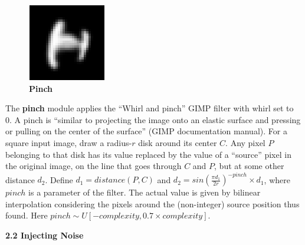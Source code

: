 \documentclass{article} %
\begin{document}
\begin{figure}
\vspace*{-5mm}
\begin{center}
\includegraphics[scale=.4]{images/Pinch_only.png}\\
{\bf Pinch}
\end{center}
\end{figure}
The {\bf pinch} module applies the ``Whirl and pinch'' GIMP filter with whirl set to 0. 
A pinch is ``similar to projecting the image onto an elastic
surface and pressing or pulling on the center of the surface'' (GIMP documentation manual).
For a square input image, draw a radius-$r$ disk
around its center $C$. Any pixel $P$ belonging to
that disk has its value replaced by
the value of a ``source'' pixel in the original image,
on the line that goes through $C$ and $P$, but
at some other distance $d_2$. Define $d_1=distance(P,C)$
and $d_2 = sin(\frac{\pi{}d_1}{2r})^{-pinch} \times
d_1$, where $pinch$ is a parameter of the filter.
The actual value is given by bilinear interpolation considering the pixels
around the (non-integer) source position thus found.
Here $pinch \sim U[-complexity, 0.7 \times complexity]$.

\vspace{1mm}

{\large\bf 2.2 Injecting Noise}
\vspace{2mm}
\end{document}
